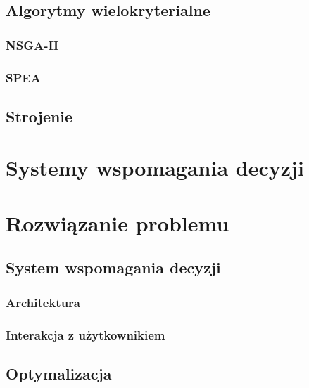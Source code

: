 \documentclass[twoside]{iisthesis}
\begin{document}
\section{Algorytmy wielokryterialne}
\subsection{NSGA-II}
\subsection{SPEA}
\section{Strojenie}

\chapter{Systemy wspomagania decyzji}

\chapter{Rozwiązanie problemu}
\section{System wspomagania decyzji}
\subsection{Architektura}
\subsection{Interakcja z użytkownikiem}
\section{Optymalizacja}
\end{document}
